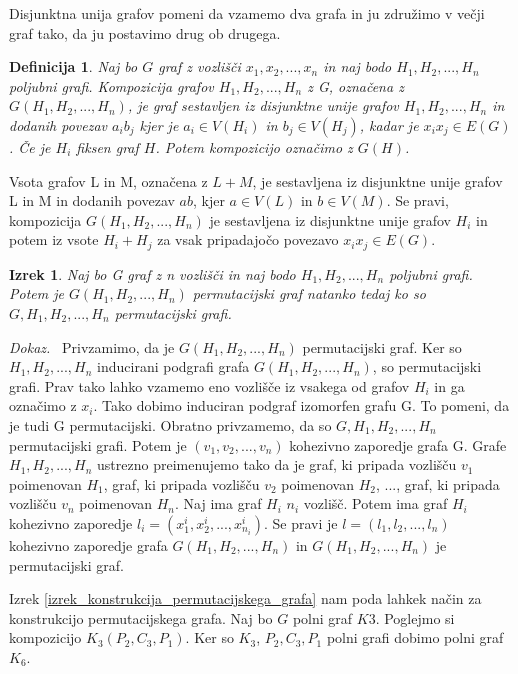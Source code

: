 \documentclass[a4paper, 12pt]{book}
\newtheorem{definicija}{Definicija}[chapter]
\newtheorem{izrek}{Izrek}[chapter]
\newenvironment{dokaz}{\emph{Dokaz.}\ }{\hspace{\fill}{$\Box$}}
\begin{document}
Disjunktna unija grafov pomeni da vzamemo dva grafa in ju združimo v večji graf tako, da ju postavimo drug ob drugega.

\begin{definicija}
    Naj bo $G$ graf z vozlišči $x_1, x_2, ..., x_n$ in naj bodo $H_1, H_2, ..., H_n$ poljubni grafi. Kompozicija grafov $H_1, H_2, ..., H_n$ z G, označena z $G(H_1, H_2, ..., H_n)$, je graf sestavljen iz disjunktne unije grafov $H_1, H_2, ..., H_n$ in dodanih povezav $a_ib_j$ kjer je $a_i \in V(H_i)$ in $b_j \in V(H_j)$, kadar je $x_ix_j \in E(G)$. Če je $H_i$ fiksen graf $H$. Potem kompozicijo označimo z $G(H)$.
\end{definicija}

Vsota grafov L in M, označena z $L + M$, je sestavljena iz disjunktne unije grafov L in M in dodanih povezav $ab$, kjer $a \in V(L)$ in $b \in V(M)$. Se pravi, kompozicija $G(H_1, H_2, ..., H_n)$ je sestavljena iz disjunktne unije grafov $H_i$ in potem iz vsote $H_i + H_j$ za vsak pripadajočo povezavo $x_ix_j \in E(G)$.

\begin{izrek}
    Naj bo G graf z n vozlišči in naj bodo $H_1, H_2, ..., H_n$ poljubni grafi. Potem je $G(H_1, H_2, ..., H_n)$ permutacijski graf natanko tedaj ko so $G, H_1, H_2, ..., H_n$ permutacijski grafi.
\end{izrek}
\begin{dokaz}
\label{izrek_konstrukcija_permutacijskega_grafa}
    Privzamimo, da je $G(H_1, H_2, ..., H_n)$ permutacijski graf. Ker so $H_1, H_2, ..., H_n$ inducirani podgrafi grafa $G(H_1, H_2, ..., H_n)$, so permutacijski grafi. Prav tako lahko vzamemo eno vozlišče iz vsakega od grafov $H_i$ in ga označimo z $x_i$. Tako dobimo induciran podgraf izomorfen grafu G. To pomeni, da je tudi G permutacijski. Obratno privzamemo, da so $G, H_1, H_2, ..., H_n$ permutacijski grafi. Potem je $(v_1, v_2, ..., v_n)$ kohezivno zaporedje grafa G. Grafe $H_1, H_2, ..., H_n$ ustrezno preimenujemo tako da je graf, ki pripada vozlišču $v_1$ poimenovan $H_1$, graf, ki pripada vozlišču $v_2$ poimenovan $H_2$, ..., graf, ki pripada vozlišču $v_n$ poimenovan $H_n$. Naj ima graf $H_i$ $n_i$ vozlišč. Potem ima graf $H_i$ kohezivno zaporedje $l_i = (x_1^i, x_2^i, ..., x_{n_i}^i)$. Se pravi je $l = (l_1, l_2, ..., l_n)$ kohezivno zaporedje grafa $G(H_1, H_2, ..., H_n)$ in $G(H_1, H_2, ..., H_n)$ je permutacijski graf.
\end{dokaz}

Izrek \ref{izrek_konstrukcija_permutacijskega_grafa} nam poda lahkek način za konstrukcijo permutacijskega grafa. Naj bo $G$ polni graf $K3$. Poglejmo si kompozicijo $K_3(P_2, C_3, P_1)$. Ker so $K_3$, $P_2, C_3, P_1$ polni grafi dobimo polni graf $K_6$.
\end{document}
